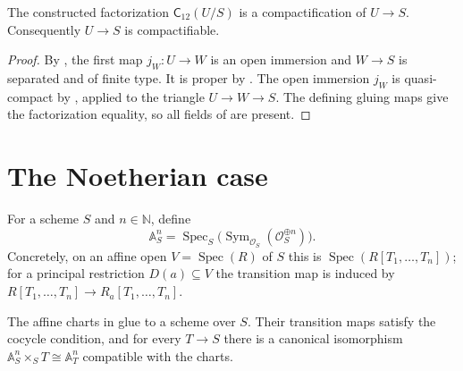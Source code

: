 \begin{theorem}
  \label{thm:nagata-two-open}

  The constructed factorization $\mathsf C_{12}(U/S)$ is a compactification
  of $U\to S$.  Consequently $U\to S$ is compactifiable.
\end{theorem}

\begin{proof}
  By , the first map
  $j_W\colon U\to W$ is an open immersion and $W\to S$ is separated and of
  finite type.  It is proper by
  .  The open immersion $j_W$ is
  quasi-compact by
  , applied to the
  triangle $U\to W\to S$.  The defining gluing maps give the factorization
  equality, so all fields of  are present.
\end{proof}


\section{The Noetherian case}

\begin{definition}
  \label{def:nagata-relative-affine-space}

  For a scheme $S$ and $n\in\mathbb N$, define
  \[
    \mathbb A^n_S=\operatorname{Spec}_S
      \bigl(\operatorname{Sym}_{\mathcal O_S}(\mathcal O_S^{\oplus n})\bigr).
  \]
  Concretely, on an affine open $V=\operatorname{Spec}(R)$ of $S$ this is
  $\operatorname{Spec}(R[T_1,\ldots,T_n])$; for a principal restriction
  $D(a)\subseteq V$ the transition map is induced by
  $R[T_1,\ldots,T_n]\to R_a[T_1,\ldots,T_n]$.
\end{definition}

\begin{lemma}
  \label{lemma:nagata-relative-affine-space-charts}

  The affine charts in  glue to a
  scheme over $S$.  Their transition maps satisfy the cocycle condition,
  and for every $T\to S$ there is a canonical isomorphism
  $\mathbb A^n_S\times_ST\cong\mathbb A^n_T$ compatible with the charts.
\end{lemma}

